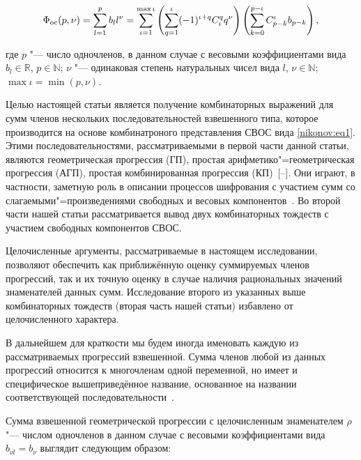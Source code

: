 \begin{equation}

\label{nikonov:eq1}

\Phi_{\rm oc}(p,\nu)=\sum\limits_{l=1}^p b_l l^\nu=\sum \limits_{\iota=1}^{\max \iota} \left(\sum \limits_{q=1}^\iota (-1)^{\iota+q} C^{q}_\iota q^\nu \right) \left(\sum_{k=0}^{p-\iota} C^\iota_{p-k}b_{p-k} \right),

\end{equation}

где $p$ "--- число одночленов, в данном случае с весовыми коэффициентами вида $b_l \in \mathbb{R}$, $p \in \mathbb{N}$; $\nu$ "--- одинаковая степень натуральных чисел вида $l$, $\nu \in \mathbb{N}$; $\max \iota=\min (p,\nu)$.



Целью настоящей статьи является получение комбинаторных выражений для сумм членов нескольких последовательностей взвешенного типа, которое производится на основе комбинатроного представления СВОС вида \eqref{nikonov:eq1}. Этими последовательностями, рассматриваемыми в первой части данной статьи, являются геометрическая прогрессия (ГП), простая арифметико"=геометрическая прогрессия (АГП), простая комбинированная прогрессия (КП)~[--]. Они играют, в частности, заметную роль в описании процессов шифрования с участием сумм со слагаемыми"=произведениями свободных и весовых компонентов~\cite{nikonov:bib11}. Во второй части нашей статьи рассматривается вывод двух комбинаторных тождеств с участием свободных компонентов СВОС.



Целочисленные аргументы, рассматриваемые в настоящем исследовании, позволяют обеспечить как приближённую оценку суммируемых членов прогрессий, так и их точную оценку в случае наличия рациональных значений знаменателей данных сумм. Исследование второго из указанных выше комбинаторных тождеств (вторая часть нашей статьи) избавлено от целочисленного характера.



В дальнейшем для краткости мы будем иногда именовать каждую из рассматриваемых прогрессий взвешенной. Сумма членов любой из данных прогрессий относится к многочленам одной переменной, но имеет и специфическое вышеприведённое название, основанное на названии соответствующей последовательности~\cite{nikonov:bib11}.



Сумма взвешенной геометрической прогрессии с целочисленным знаменателем $\rho$ "--- числом одночленов в данном случае с весовыми коэффициентами вида $b_{\nu l}=b_\nu$ выглядит следующим образом:

